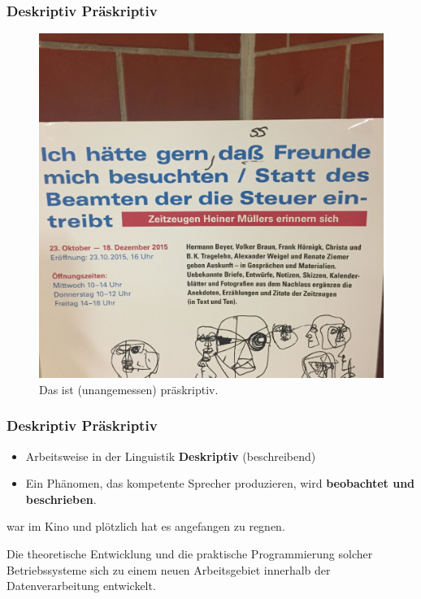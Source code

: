 \begin{frame}
\frametitle{Deskriptiv \vs Präskriptiv}

\begin{figure}
\centering
	\includegraphics[scale=.065]{material/05praeskriptiv}
	\caption{Das ist (unangemessen) präskriptiv.}\label{Abb2}
\end{figure}

\end{frame}

\begin{frame}
\frametitle{Deskriptiv \vs Präskriptiv}

\begin{itemize}
	\item Arbeitsweise in der Linguistik \ras \textbf{Deskriptiv} (beschreibend)

	\item Ein Phänomen, das kompetente Sprecher produzieren, wird \textbf{beobachtet und beschrieben}. 	

\end{itemize}
	
	\ea {} war im Kino und plötzlich hat es angefangen zu regnen.
	\z
	
	\ea Die theoretische Entwicklung und die praktische Programmierung solcher Betriebssysteme  sich zu einem neuen Arbeitsgebiet innerhalb der Datenverarbeitung entwickelt. \hfill \citep{Goschler14a}
	\z
	


\end{frame}

